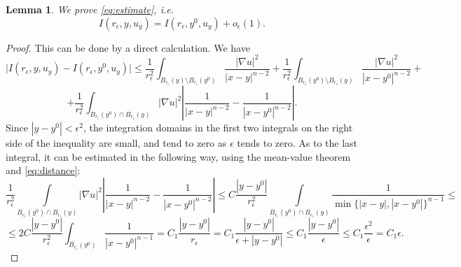 \documentclass[10pt,a4paper]{amsart}
\newtheorem{lem}{Lemma}
\begin{document}
\begin{lem}\label{lem:estimates}
 We prove    \eqref{eq:estimate}, i.e.
 \begin{equation}
    I(r_\epsilon,y,u_y) =  I(r_\epsilon,y^0,u_y) + o_\epsilon (1).
\end{equation}
\end{lem}

\begin{proof}
This can be done by a direct calculation. We have 
$$
\Big| I(r_\epsilon,y,u_{y}) -  I(r_\epsilon,y^0,u_y)| \le
\frac{1}{r_\epsilon^2 }\int_{B_{r_\epsilon} (y) \setminus 
B_{r_\epsilon} (y^0)}  \frac{|\nabla u|^2}{|x-y|^{n-2}} + 
\frac{1}{r_\epsilon^2 }\int_{B_{r_\epsilon} (y^0) \setminus 
B_{r_\epsilon} (y)}  \frac{|\nabla u|^2}{|x-y^0|^{n-2}}
+
$$
$$
+\frac{1}{r_\epsilon^2 }\int_{B_{r_\epsilon} (y^0) \cap 
B_{r_\epsilon} (y)} |\nabla u|^2\left|\frac{1}{|x-y|^{n-2}}- \frac{1}{|x-y^0|^{n-2}}\right|.
$$
Since $|y -y^0 | < \epsilon^2$,  the  integration domains in 
the first two integrals on the right side of the inequality are small, and tend to zero as $\epsilon $ tends to zero.
 As to the last integral, it can be estimated in the following way, using the mean-value theorem and \eqref{eq:distance}:
$$
\frac{1}{r_\epsilon^2 }\int\limits_{B_{r_\epsilon} (y^0) \cap 
B_{r_\epsilon} (y)} |\nabla u|^2\left|\frac{1}{|x-y|^{n-2}}- \frac{1}{|x-y^0|^{n-2}}\right| \le C  \frac{|y-y^0|}{r_\epsilon^2 }\int\limits_{B_{r_\epsilon} (y^0) \cap 
B_{r_\epsilon} (y)} \frac{1}{\min\{|x-y|, |x-y^0|\}^{n-1}}\le 
$$
$$
\le 2C
\frac{|y-y^0|}{r_\epsilon^2 }\int_{B_{r_\epsilon} (y^0)} \frac{1}{|x-y^0|^{n-1}} =  C_1\frac{|y-y^0|}{r_\epsilon} = 
C_1\frac{|y-y^0|}{\epsilon+|y-y^0|}\le C_1\frac{|y-y^0|}{\epsilon}\le C_1\frac{\epsilon^2}{\epsilon} = C_1\epsilon. 
$$

\end{proof}
\end{document}
